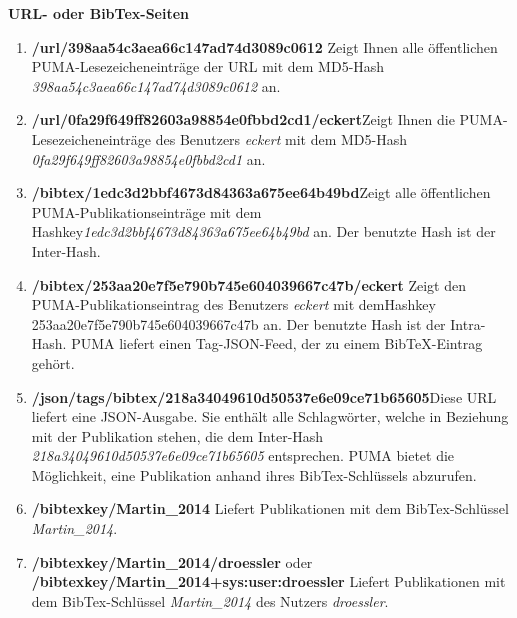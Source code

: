\documentclass[b5paper,11pt,twoside]{scrbook} %
\begin{document}
\textbf{URL- oder BibTex-Seiten}
\begin{enumerate}
    \item \textbf{/url/398aa54c3aea66c147ad74d3089c0612}\newline
    Zeigt Ihnen alle öffentlichen PUMA-Lesezeicheneinträge der URL mit dem MD5-Hash \textit{398aa54c3aea66c147ad74d3089c0612} an.
    \item \textbf{/url/0fa29f649ff82603a98854e0fbbd2cd1/eckert}\newline Zeigt Ihnen die PUMA-Lesezeicheneinträge des Benutzers \textit{eckert} mit dem MD5-Hash \textit{0fa29f649ff82603a98854e0fbbd2cd1} an.
	\item \textbf{/bibtex/1edc3d2bbf4673d84363a675ee64b49bd}\newline Zeigt alle öffentlichen PUMA-Publikationseinträge mit dem Hashkey\newline \textit{1edc3d2bbf4673d84363a675ee64b49bd} an. Der benutzte Hash ist der Inter-Hash.
    \item \textbf{/bibtex/253aa20e7f5e790b745e604039667c47b/eckert}\newline
    Zeigt den PUMA-Publikationseintrag des Benutzers \textit{eckert} mit dem\newline Hashkey 253aa20e7f5e790b745e604039667c47b an. Der benutzte Hash ist der Intra-Hash. PUMA liefert einen Tag-JSON-Feed, der zu einem BibTeX-Eintrag gehört.
    \item \textbf{/json/tags/bibtex/218a34049610d50537e6e09ce71b65605}\newline Diese URL liefert eine JSON-Ausgabe. Sie enthält alle Schlagwörter, welche in Beziehung mit der Publikation stehen, die dem Inter-Hash \textit{218a34049610d50537e6e09ce71b65605} entsprechen. PUMA bietet die Möglichkeit, eine Publikation anhand ihres BibTex-Schlüssels abzurufen.
    \item \textbf{/bibtexkey/Martin\_2014} \newline
    Liefert Publikationen mit dem BibTex-Schlüssel \textit{Martin\_2014}.
    \item \textbf{/bibtexkey/Martin\_2014/droessler} 
    oder \newline \textbf{/bibtexkey/Martin\_2014+sys:user:droessler}\newline
    Liefert Publikationen mit dem BibTex-Schlüssel \textit{Martin\_2014} des Nutzers \textit{droessler}.

\end{enumerate}
\end{document}
